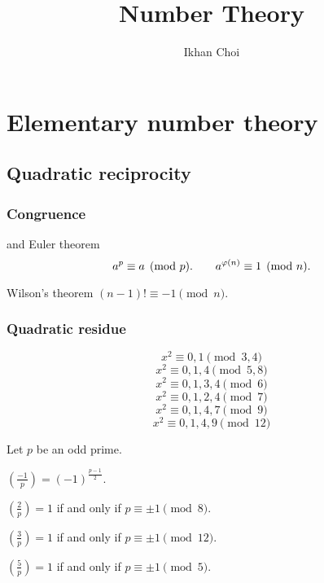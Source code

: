 \documentclass{../../large}
\begin{document}
\title{Number Theory}
\author{Ikhan Choi}
\maketitle
\tableofcontents

\part{Elementary number theory}

\chapter{Quadratic reciprocity}

\section{Congruence}

\begin{prb}
	
\end{prb}


\begin{prb}
and Euler theorem
\[a^p\equiv a\pmod p.\qquad a^{\varphi(n)}\equiv1\pmod n.\]
\end{prb}

Wilson's theorem $(n-1)!\equiv-1\pmod n$.


\section{Quadratic residue}

\begin{prb}
\[x^2\equiv0,1\pmod{3,4}\]
\[x^2\equiv0,1,4\pmod{5,8}\]
\[x^2\equiv0,1,3,4\pmod{6}\]
\[x^2\equiv0,1,2,4\pmod{7}\]
\[x^2\equiv0,1,4,7\pmod{9}\]
\[x^2\equiv0,1,4,9\pmod{12}\]
\end{prb}

\begin{prb}
Let $p$ be an odd prime.
\begin{parts}
\item $\left(\frac{-1}p\right)=(-1)^{\frac{p-1}2}$.
\item $\left(\frac2p\right)=1$ if and only if $p\equiv\pm1\pmod8$.
\item $\left(\frac3p\right)=1$ if and only if $p\equiv\pm1\pmod{12}$.
\item $\left(\frac5p\right)=1$ if and only if $p\equiv\pm1\pmod5.$
\end{parts}
\end{prb}
\end{document}
